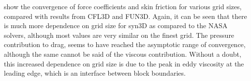  show the convergence of force coefficients and skin friction for various grid sizes, compared with results from CFL3D and FUN3D. Again, it can be seen that there is much more dependence on grid size for syn3D as compared to the NASA solvers, although most values are very similar on the finest grid. The pressure contribution to drag, seems to have reached the asymptotic range of convergence, although the same cannot be said of the viscous contribution. Without a doubt, this increased dependence on grid size is due to the peak in eddy viscosity at the leading edge, which is an interface between block boundaries.

